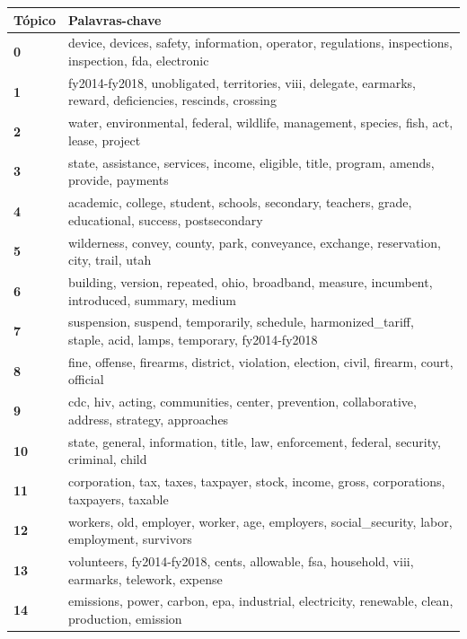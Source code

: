 \begin{table}[htpb]
    \centering
    \scriptsize
    \begin{tabularx}{\textwidth}{@{}l X@{}}
        \toprule
        \textbf{Tópico} & \textbf{Palavras-chave} \\
        \midrule
        \textbf{0} & device, devices, safety, information, operator, regulations, inspections, inspection, fda, electronic \\
        \textbf{1} & fy2014-fy2018, unobligated, territories, viii, delegate, earmarks, reward, deficiencies, rescinds, crossing \\
        \textbf{2} & water, environmental, federal, wildlife, management, species, fish, act, lease, project \\
        \textbf{3} & state, assistance, services, income, eligible, title, program, amends, provide, payments \\
        \textbf{4} & academic, college, student, schools, secondary, teachers, grade, educational, success, postsecondary \\
        \textbf{5} & wilderness, convey, county, park, conveyance, exchange, reservation, city, trail, utah \\
        \textbf{6} & building, version, repeated, ohio, broadband, measure, incumbent, introduced, summary, medium \\
        \textbf{7} & suspension, suspend, temporarily, schedule, harmonized\_tariff, staple, acid, lamps, temporary, fy2014-fy2018 \\
        \textbf{8} & fine, offense, firearms, district, violation, election, civil, firearm, court, official \\
        \textbf{9} & cdc, hiv, acting, communities, center, prevention, collaborative, address, strategy, approaches \\
        \textbf{10} & state, general, information, title, law, enforcement, federal, security, criminal, child \\
        \textbf{11} & corporation, tax, taxes, taxpayer, stock, income, gross, corporations, taxpayers, taxable \\
        \textbf{12} & workers, old, employer, worker, age, employers, social\_security, labor, employment, survivors \\
        \textbf{13} & volunteers, fy2014-fy2018, cents, allowable, fsa, household, viii, earmarks, telework, expense \\
        \textbf{14} & emissions, power, carbon, epa, industrial, electricity, renewable, clean, production, emission \\

\end{tabularx}
\end{table}
